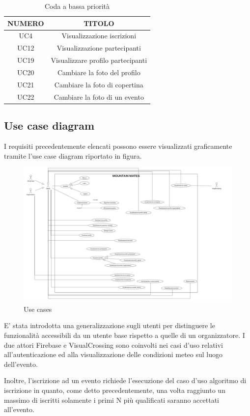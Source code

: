 \begin{table}
\begin{center}
\begin{tabular}{ |c|c|}
 \hline
 \textbf{NUMERO}& \textbf{TITOLO} \\ \hline
 UC4& Visualizzazione iscrizioni\\ \hline
 UC12& Visualizzazione partecipanti\\ \hline
 UC19& Visualizzare profilo partecipanti\\ \hline
 UC20& Cambiare la foto del profilo\\ \hline
 UC21& Cambiare la foto di copertina\\ \hline
 UC22& Cambiare la foto di un evento\\ \hline
\end{tabular}
  \caption{Coda a bassa priorità}
  \label{tab: bassa-priorità}
\end{center}
\end{table}

\clearpage
\subsection{Use case diagram}
I requisiti precedentemente elencati possono essere visualizzati graficamente tramite l'use case diagram riportato in figura.

\begin{figure}[ht!]
    \centering
    \includegraphics[scale=0.55]{immagini/UseCases.png}
    \caption{Use cases}
    \label{fig: usecases}
  \end{figure}

E' stata introdotta una generalizzazione sugli utenti per distinguere le funzionalità accessibili da un utente base
rispetto a quelle di un organizzatore.
I due attori Firebase e VisualCrossing sono coinvolti nei casi d'uso relativi all'autenticazione ed alla visualizzazione delle
condizioni meteo sul luogo dell'evento.

Inoltre, l'iscrizione ad un evento richiede l'esecuzione del caso d'uso algoritmo di iscrizione in quanto, come detto precedentemente,
una volta raggiunto un massimo di iscritti solamente i primi N più qualificati saranno accettati all'evento.